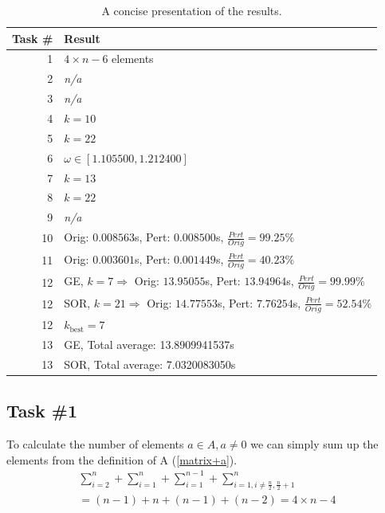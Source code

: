 \documentclass[10pt, a4paper]{article}
\begin{document}
\begin{table}[h]
\begin{center}
\begin{tabular}{r | l}
Task \# & Result \\ \hline
1		& $4\times n-6$ elements                                                     			\\
2		& \emph{n/a}                                                                 			\\
3		& \emph{n/a}                                                                 			\\
4		& $k=10$                                                                     			\\
5		& $k=22$	                                                             			\\
6		& $\omega\in[1.105500, 1.212400]$                                            			\\
7		& $k=13$                                                                     			\\
8		& $k=22$                                                                     			\\
9		& \emph{n/a}                                                                 			\\
10		& Orig: $0.008563$s, Pert: $0.008500$s, $\frac{Pert}{Orig}=99.25\%$ 	     			\\
11		& Orig: $0.003601$s, Pert: $0.001449$s, $\frac{Pert}{Orig}=40.23\%$ 	     			\\
12		& GE, $k=7 \Rightarrow$ Orig: $13.95055$s, Pert: $13.94964$s, $\frac{Pert}{Orig}=99.99\%$	\\ 
12		& SOR, $k=21 \Rightarrow$ Orig: $14.77553$s, Pert: $7.76254$s, $\frac{Pert}{Orig}=52.54\%$	\\
12		& $k_\mathrm{best}=7$ 										\\
13		& GE, Total average: 13.8909941537s								\\
13		& SOR, Total average: 7.0320083050s %
\end{tabular}
\caption{A concise presentation of the results.}
\end{center}
\label{table+result}
\end{table}

\subsection{Task \#1}
To calculate the number of elements $a\in A, a\neq0$ we can simply sum up the elements from the definition of A (\ref{matrix+a}).
\begin{eqnarray}
		\sum_{i=2}^n + \sum_{i=1}^n+\sum_{i=1}^{n-1}+\sum_{i=1,i\neq \frac{n}{2},\frac{n}{2}+1}^n \\
		= (n-1)+n+(n-1)+(n-2)=4\times n -4
\end{eqnarray}
\end{document}
